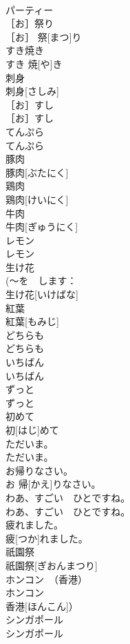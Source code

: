\documentclass[8pt]{extreport}
\begin{document}
\begin{CJK}{UTF8}{min}
\\	パーティー	
\\	［お］祭り	
\\	［お］ 祭[まつ]り	
\\	すき焼き	
\\	すき 焼[や]き	
\\	刺身	
\\	刺身[さしみ]	
\\	［お］すし	
\\	［お］すし	
\\	てんぷら	
\\	てんぷら	
\\	豚肉	
\\	豚肉[ぶたにく]	
\\	鶏肉	
\\	鶏肉[けいにく]	
\\	牛肉	
\\	牛肉[ぎゅうにく]	
\\	レモン	
\\	レモン	
\\	生け花	
\\	(～を　します：
\\	生け花[いけばな]	
\\	紅葉	
\\	紅葉[もみじ]	
\\	どちらも	
\\	どちらも	
\\	いちばん	
\\	いちばん	
\\	ずっと	
\\	ずっと	
\\	初めて	
\\	初[はじ]めて	
\\	ただいま。	
\\	ただいま。	
\\	お帰りなさい。	
\\	お 帰[かえ]りなさい。	
\\	わあ、すごい　ひとですね。	
\\	わあ、すごい　ひとですね。	
\\	疲れました。	
\\	疲[つか]れました。	
\\	祇園祭	
\\	祇園祭[ぎおんまつり]	
\\	ホンコン　（香港）	
\\	ホンコン　
\\	香港[ほんこん]）	
\\	シンガポール	
\\	シンガポール	

\end{CJK}
\end{document}
